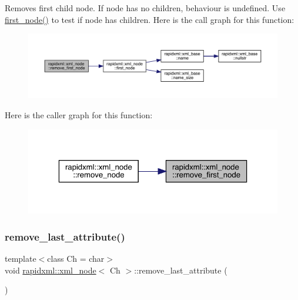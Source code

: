 Removes first child node. If node has no children, behaviour is undefined. Use \mbox{\hyperlink{classrapidxml_1_1xml__node_acdf3691224d683f50692616a92a75d3f}{first\+\_\+node()}} to test if node has children. Here is the call graph for this function\+:\nopagebreak
\begin{figure}[H]
\begin{center}
\leavevmode
\includegraphics[width=350pt]{classrapidxml_1_1xml__node_a62bf7b276cf7a651a3337f5e0a0ef6ac_cgraph}
\end{center}
\end{figure}
Here is the caller graph for this function\+:\nopagebreak
\begin{figure}[H]
\begin{center}
\leavevmode
\includegraphics[width=323pt]{classrapidxml_1_1xml__node_a62bf7b276cf7a651a3337f5e0a0ef6ac_icgraph}
\end{center}
\end{figure}
\mbox{\label{classrapidxml_1_1xml__node_a1781a2cbedc9a51d609ad5b528125635}} 
\subsubsection{\texorpdfstring{remove\_last\_attribute()}{remove\_last\_attribute()}}
{\footnotesize\ttfamily template$<$class Ch = char$>$ \\
void \mbox{\hyperlink{classrapidxml_1_1xml__node}{rapidxml\+::xml\+\_\+node}}$<$ Ch $>$\+::remove\+\_\+last\+\_\+attribute (\begin{DoxyParamCaption}{ }\end{DoxyParamCaption})\hspace{0.3cm}{\ttfamily [inline]}}


